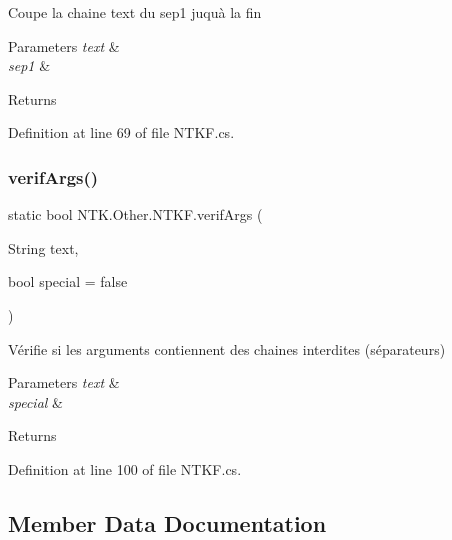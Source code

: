 Coupe la chaine text du sep1 juqu\textquotesingle{}à la fin 


\begin{DoxyParams}{Parameters}
{\em text} & \\
\hline
{\em sep1} & \\
\hline
\end{DoxyParams}
\begin{DoxyReturn}{Returns}

\end{DoxyReturn}


Definition at line 69 of file N\+T\+K\+F.\+cs.

\mbox{\label{class_n_t_k_1_1_other_1_1_n_t_k_f_a159530788f425b3ba026c397711a08cb}} 
\subsubsection{\texorpdfstring{verifArgs()}{verifArgs()}}
{\footnotesize\ttfamily static bool N\+T\+K.\+Other.\+N\+T\+K\+F.\+verif\+Args (\begin{DoxyParamCaption}\item[{String}]{text,  }\item[{bool}]{special = {\ttfamily false} }\end{DoxyParamCaption})\hspace{0.3cm}{\ttfamily [static]}}



Vérifie si les arguments contiennent des chaines interdites (séparateurs) 


\begin{DoxyParams}{Parameters}
{\em text} & \\
\hline
{\em special} & \\
\hline
\end{DoxyParams}
\begin{DoxyReturn}{Returns}

\end{DoxyReturn}


Definition at line 100 of file N\+T\+K\+F.\+cs.



\subsection{Member Data Documentation}
\mbox{\label{class_n_t_k_1_1_other_1_1_n_t_k_f_a99efcb73a5df254faeb3e4e049548dc2}} 
